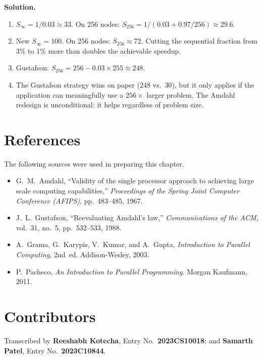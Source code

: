 \begin{ppexercises}
{\textbf{Solution.}
\begin{enumerate}[label=(\alph*)]
  \item $S_\infty = 1/0.03 \approx 33$.  On 256 nodes:
        $S_{256} = 1/(0.03 + 0.97/256) \approx 29.6$.
  \item New $S_\infty = 100$.  On 256 nodes:
        $S_{256} \approx 72$.  Cutting the sequential fraction from 3\%
        to 1\% more than doubles the achievable speedup.
  \item Gustafson: $S_{256} = 256 - 0.03 \times 255 \approx 248$.
  \item The Gustafson strategy wins on paper ($248$ vs.\ $30$), but it
        only applies if the application can meaningfully use a
        $256\times$ larger problem.  The Amdahl redesign is
        unconditional: it helps regardless of problem size.
\end{enumerate}
}

\end{ppexercises}

\section*{References}

The following sources were used in preparing this chapter.

\begin{itemize}
  \item G.~M.~Amdahl, ``Validity of the single processor approach to
        achieving large scale computing capabilities,'' \emph{Proceedings
        of the Spring Joint Computer Conference (AFIPS)}, pp.~483--485,
        1967.~\cite{amdahl1967}
  \item J.~L.~Gustafson, ``Reevaluating Amdahl's law,'' \emph{Communications
        of the ACM}, vol.~31, no.~5, pp.~532--533, 1988.~\cite{gustafson1988}
  \item A.~Grama, G.~Karypis, V.~Kumar, and A.~Gupta,
        \emph{Introduction to Parallel Computing}, 2nd~ed.
        Addison-Wesley, 2003.~\cite{grama2003}
  \item P.~Pacheco, \emph{An Introduction to Parallel Programming}.
        Morgan Kaufmann, 2011.~\cite{pacheco2011}
\end{itemize}

\section*{Contributors}

\begin{ppnote}
Transcribed by \textbf{Reeshabh Kotecha}, Entry No.\ \textbf{2023CS10018}; and
\textbf{Samarth Patel}, Entry No.\ \textbf{2023C10844}.
\end{ppnote}
